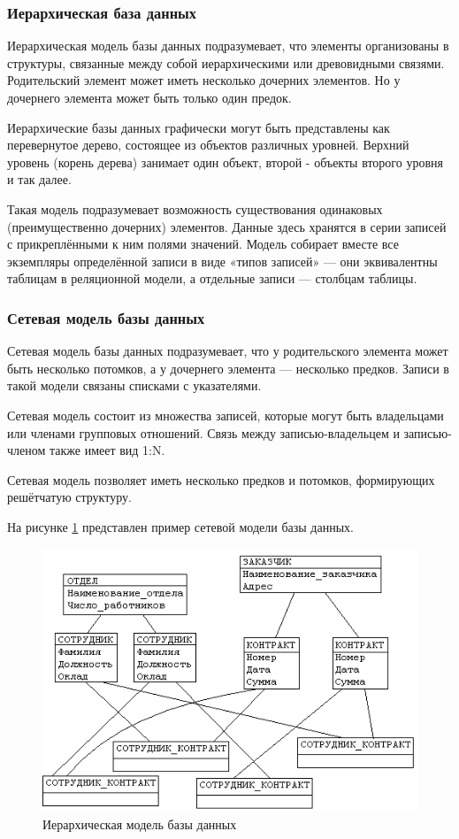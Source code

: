 \subsubsection{Иерархическая база данных}
Иерархическая модель базы данных подразумевает, что элементы организованы в структуры, связанные между собой иерархическими или древовидными связями. Родительский элемент может иметь несколько дочерних элементов. Но у дочернего элемента может быть только один предок.

Иерархические базы данных графически могут быть представлены как перевернутое дерево, состоящее из объектов различных уровней. Верхний уровень (корень дерева) занимает один объект, второй - объекты второго уровня и так далее. 

Такая модель подразумевает возможность существования одинаковых (преимущественно дочерних) элементов. Данные здесь хранятся в серии записей с прикреплёнными к ним полями значений. Модель собирает вместе все экземпляры определённой записи в виде «типов записей» — они эквивалентны таблицам в реляционной модели, а отдельные записи — столбцам таблицы.

\subsubsection{Сетевая модель базы данных}
Сетевая модель базы данных подразумевает, что у родительского элемента может быть несколько потомков, а у дочернего элемента — несколько предков. Записи в такой модели связаны списками с указателями. 

Сетевая модель состоит из множества записей, которые могут быть владельцами или членами групповых отношений. Связь между записью-владельцем и записью-членом также имеет вид 1:N.

Сетевая модель позволяет иметь несколько предков и потомков, формирующих решётчатую структуру.

На рисунке \ref{img:set} представлен пример сетевой модели базы данных.

\begin{figure}[h!]
	\centering
	\includegraphics[scale=1]{img/set.png}
	\caption{Иерархическая модель базы данных}
	\label{img:set}
\end{figure}

